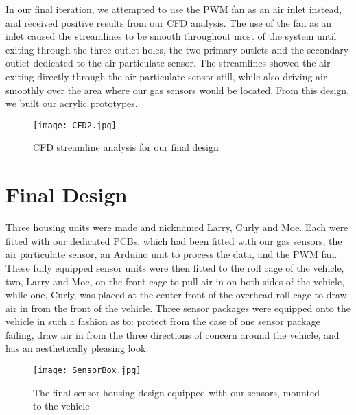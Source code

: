 In our final iteration, we attempted to use the PWM fan as an air inlet instead, and received positive results from our CFD analysis. The use of the fan as an inlet caused the streamlines to be smooth throughout most of the system until exiting through the three outlet holes, the two primary outlets and the secondary outlet dedicated to the air particulate sensor. The streamlines showed the air exiting directly through the air particulate sensor still, while also driving air smoothly over the area where our gas sensors would be located. From this design, we built our acrylic prototypes. 

\begin{figure}[H]
	\centering
	\texttt{[image: CFD2.jpg]}
	\caption{CFD streamline analysis for our final design}
	\label{fig:CFD}
\end{figure}

\section{Final Design}
Three housing units were made and nicknamed Larry, Curly and Moe. Each were fitted with our dedicated PCBs, which had been fitted with our gas sensors, the air particulate sensor, an Arduino unit to process the data, and the PWM fan. These fully equipped sensor units were then fitted to the roll cage of the vehicle, two, Larry and Moe, on the front cage to pull air in on both sides of the vehicle, while one, Curly, was placed at the center-front of the overhead roll cage to draw air in from the front of the vehicle. Three sensor packages were equipped onto the vehicle in such a fashion as to: protect from the case of one sensor package failing, draw air in from the three directions of concern around the vehicle, and has an aesthetically pleasing look.

\begin{figure}[H]
	\centering
	\texttt{[image: SensorBox.jpg]}
	\caption{The final sensor housing design equipped with our sensors, mounted to the vehicle}
	\label{fig:Box}
\end{figure}
